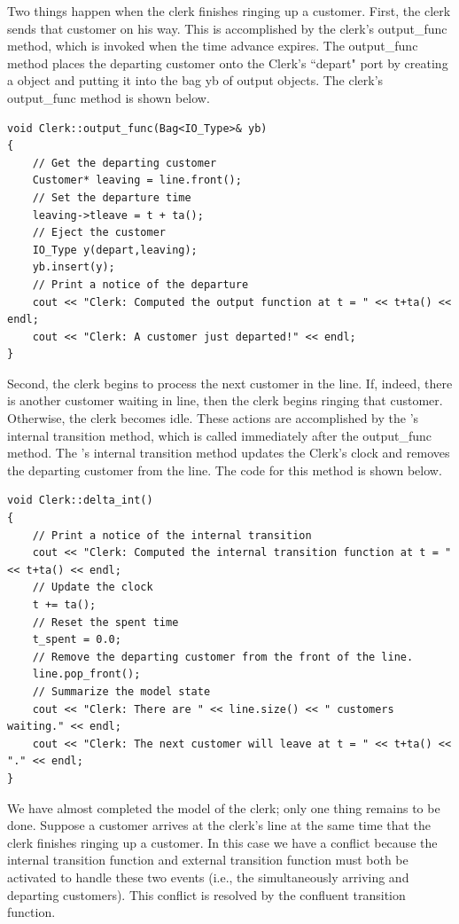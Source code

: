 Two things happen when the clerk finishes ringing up a customer. First, the clerk sends that customer on his way. This is accomplished by the clerk's output\_func method, which is invoked when the time advance expires. The output\_func method places the departing customer onto the Clerk's ``depart" port by creating a  object and putting it into the bag yb of output objects. The clerk's output\_func method is shown below.
\begin{verbatim}
void Clerk::output_func(Bag<IO_Type>& yb)
{
    // Get the departing customer
    Customer* leaving = line.front();
    // Set the departure time
    leaving->tleave = t + ta();
    // Eject the customer
    IO_Type y(depart,leaving);
    yb.insert(y);
    // Print a notice of the departure
    cout << "Clerk: Computed the output function at t = " << t+ta() << endl;
    cout << "Clerk: A customer just departed!" << endl;
}
\end{verbatim}

Second, the clerk begins to process the next customer in the line. If, indeed, there is another customer waiting in line, then the clerk begins ringing that customer. Otherwise, the clerk becomes idle. These actions are accomplished by the 's internal transition method, which is called immediately after the output\_func method. The 's internal transition method updates the Clerk's clock and removes the departing customer from the line. The code for this method is shown below.
\begin{verbatim}
void Clerk::delta_int()
{
    // Print a notice of the internal transition
    cout << "Clerk: Computed the internal transition function at t = " << t+ta() << endl;
    // Update the clock
    t += ta();
    // Reset the spent time
    t_spent = 0.0;
    // Remove the departing customer from the front of the line.
    line.pop_front();
    // Summarize the model state
    cout << "Clerk: There are " << line.size() << " customers waiting." << endl;
    cout << "Clerk: The next customer will leave at t = " << t+ta() << "." << endl;
}
\end{verbatim}

We have almost completed the model of the clerk; only one thing remains to be done. Suppose a customer arrives at the clerk's line at the same time that the clerk finishes ringing up a customer. In this case we have a conflict because the internal transition function and external transition function must both be activated to handle these two events (i.e., the simultaneously arriving and departing customers). This conflict is resolved by the confluent transition function.

